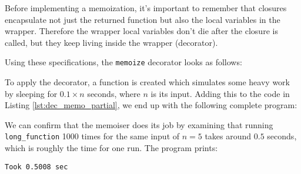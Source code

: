\documentclass[a4paper]{article}
\begin{document}
Before implementing a memoization, it's important to remember that closures encapsulate not just the returned function but also the local variables in the wrapper. Therefore the wrapper local variables don't die after the closure is called, but they keep living inside the wrapper (decorator).

Using these specifications, the \texttt{memoize} decorator looks as follows:


To apply the decorator, a function is created which simulates some heavy work by sleeping for $0.1\times n$ seconds, where $n$ is its input. Adding this to the code in Listing \ref{lst:dec_memo_partial}, we end up with the following complete program:

We can confirm that the memoiser does its job by examining that running \texttt{long\_function} 1000 times for the same input of $n=5$ takes around $0.5$ seconds, which is roughly the time for one run. The program prints:
\begin{verbatim}
Took 0.5008 sec
\end{verbatim}



\clearpage


\newpage
\printbibliography





\end{document}
